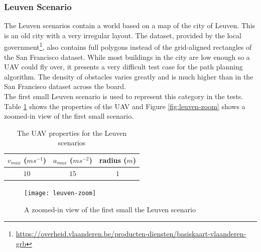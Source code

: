 \subsubsection{Leuven Scenario}
\label{subsec:leuven}
The Leuven scenarios contain a world based on a map of the city of Leuven. This is an old city with a very irregular layout. The dataset, provided by the local government\footnote{\url{https://overheid.vlaanderen.be/producten-diensten/basiskaart-vlaanderen-grb}}, also contains full polygons instead of the grid-aligned rectangles of the San Francisco dataset. While most buildings in the city are low enough so a UAV could fly over, it presents a very difficult test case for the path planning algorithm. The density of obstacles varies greatly and is much higher than in the San Francisco dataset across the board.\\
The first small Leuven scenario is used to represent this category in the tests. Table \ref{table:uav-leuven} shows the properties of the UAV and Figure \ref{fig:leuven-zoom} shows a zoomed-in view of the first small scenario. 
\begin{table}[h]
\centering
\begin{tabular}{ c | c | c }
$v_{max}$ ($ms^{-1}$)	& $a_{max}$ ($ms^{-2}$) 	& radius ($m$) 	 \\
\hline
$10$ & $15$ 	& $1$ \\
\end{tabular}
\caption{The UAV properties for the Leuven scenarios}
\label{table:uav-leuven}
\end{table}

\begin{figure}[h]
	\centering
	\texttt{[image: leuven-zoom]}
	\caption{A zoomed-in view of the first small the Leuven scenario}
	\label{fig:sf-zoom}
\end{figure}



